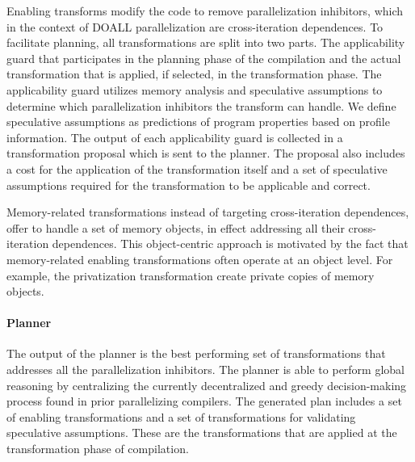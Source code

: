 Enabling transforms modify the code to remove parallelization
inhibitors, which in the context of DOALL parallelization are
cross-iteration dependences.
%
To facilitate planning, all transformations are split into two parts.
The applicability guard that participates in the planning phase of the
compilation and the actual transformation that is applied, if
selected, in the transformation phase.
The applicability guard utilizes memory analysis and speculative
assumptions to determine which parallelization inhibitors the
transform can handle.
%
We define speculative assumptions as predictions of program properties
based on profile information.
%
%
The output of each applicability guard is collected in a
transformation proposal which is sent to the planner.
%
%
The proposal also includes a cost for the application of the
transformation itself and a set of speculative assumptions required
for the transformation to be applicable and correct.

Memory-related transformations instead of targeting cross-iteration
dependences, offer to handle a set of memory objects, in effect
addressing all their cross-iteration dependences. This object-centric
approach is motivated by the fact that memory-related enabling
transformations often operate at an object level. For example, the
privatization transformation create private copies of memory objects.

\paragraph{Planner}

%
The output of the planner is the best performing set of
transformations that addresses all the parallelization inhibitors.
%
The planner is able to perform global reasoning by centralizing the
currently decentralized and greedy decision-making process found in
prior parallelizing compilers.
%
The generated plan includes a set of enabling transformations and a
set of transformations for validating speculative assumptions.
%
These are the transformations that are applied at the transformation
phase of compilation.

